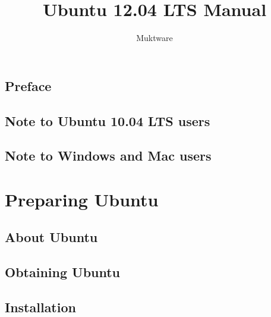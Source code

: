 \documentclass[10pt,a4paper,oneside,final,titlepage]{book}
\author{Muktware}
\title{Ubuntu 12.04 LTS Manual}
\begin{document}




\newpage
\thispagestyle{empty}
\mbox{}
\pagestyle{fancy}
	\fancyhf{}
	\lhead{}
	\rhead{}
	\cfoot{\thepage}
	\renewcommand{\headrulewidth}{0pt}

\chapter*{Preface} 


\setcounter{page}{1}
\tableofcontents 
\clearpage


\pagestyle{fancy}
	\fancyhf{}
	\fancyheadoffset{0.3cm}
	\lhead{\nouppercase \leftmark}
	\cfoot{\thepage}
	\renewcommand{\chaptermark}[1]{\markboth{#1}{}}
	\renewcommand{\headrulewidth}{0pt}

%

\chapter{Note to Ubuntu 10.04 LTS users}


\chapter{Note to Windows and Mac users} \label{chap:other-users}


\part{Preparing Ubuntu}

\chapter{About Ubuntu} \label{sect:about-ubuntu}


\chapter{Obtaining Ubuntu} \label{sect:obtain_ubuntu}


\chapter{Installation} \label{chap:install}

\end{document}
